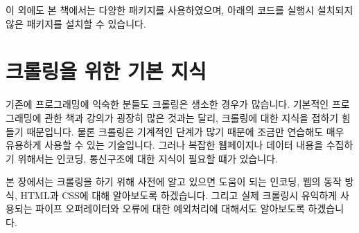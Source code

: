 \documentclass[12pt,]{book}
\newenvironment{Shaded}{\begin{snugshade}}{\end{snugshade}}
\newcommand{\ControlFlowTok}[1]{\textcolor[rgb]{0.13,0.29,0.53}{\textbf{#1}}}
\newcommand{\DataTypeTok}[1]{\textcolor[rgb]{0.13,0.29,0.53}{#1}}
\newcommand{\KeywordTok}[1]{\textcolor[rgb]{0.13,0.29,0.53}{\textbf{#1}}}
\newcommand{\NormalTok}[1]{#1}
\newcommand{\OperatorTok}[1]{\textcolor[rgb]{0.81,0.36,0.00}{\textbf{#1}}}
\newcommand{\OtherTok}[1]{\textcolor[rgb]{0.56,0.35,0.01}{#1}}
\newcommand{\StringTok}[1]{\textcolor[rgb]{0.31,0.60,0.02}{#1}}
\begin{document}
이 외에도 본 책에서는 다양한 패키지를 사용하였으며, 아래의 코드를 실행시 설치되지 않은 패키지를 설치할 수 있습니다.

\begin{Shaded}
\end{Shaded}

\hypertarget{section-4}{%
\chapter{크롤링을 위한 기본 지식}\label{section-4}}

기존에 프로그래밍에 익숙한 분들도 크롤링은 생소한 경우가 많습니다. 기본적인 프로그래밍에 관한 책과 강의가 굉장히 많은 것과는 달리, 크롤링에 대한 지식을 접하기 힘들기 때문입니다. 물론 크롤링은 기계적인 단계가 많기 때문에 조금만 연습해도 매우 유용하게 사용할 수 있는 기술입니다. 그러나 복잡한 웹페이지나 데이터 내용을 수집하기 위해서는 인코딩, 통신구조에 대한 지식이 필요할 떄가 있습니다.

본 장에서는 크롤링을 하기 위해 사전에 알고 있으면 도움이 되는 인코딩, 웹의 동작 방식, HTML과 CSS에 대해 알아보도록 하겠습니다. 그리고 실제 크롤링시 유익하게 사용되는 파이프 오퍼레이터와 오류에 대한 예외처리에 대해서도 알아보도록 하겠습니다.
\end{document}

